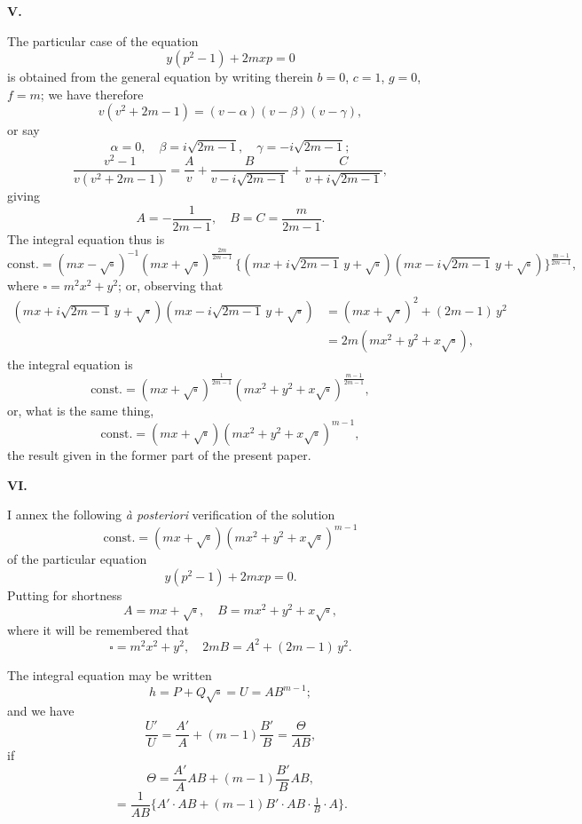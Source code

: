 \documentclass[11pt,a4paper]{article}
\theoremstyle{plain}
\begin{document}
\newpage
\begin{center}\textbf{V.}\end{center}

The particular case of the equation
\[
y(p^2 - 1) + 2 m x p = 0
\]
is obtained from the general equation by writing therein $b = 0$, $c = 1$, $g = 0$, $f = m$; we have therefore
\[
v(v^2 + 2 m - 1) = (v - \alpha)(v - \beta)(v - \gamma),
\]
or say
\[
\alpha = 0,\quad \beta = i\sqrt{2 m - 1},\quad \gamma = -i\sqrt{2 m - 1};
\]
\[
\frac{v^2 - 1}{v(v^2 + 2 m - 1)} = \frac{A}{v} + \frac{B}{v - i\sqrt{2 m - 1}} + \frac{C}{v + i\sqrt{2 m - 1}},
\]
giving
\[
A = -\frac{1}{2 m - 1},\quad B = C = \frac{m}{2 m - 1}.
\]
The integral equation thus is
\[
\text{const.} = (m x - \sqrt{\square})^{-1}(m x + \sqrt{\square})^{\frac{2m}{2m-1}}\,
\{(m x + i\sqrt{2 m - 1}\,y + \sqrt{\square})(m x - i\sqrt{2 m - 1}\,y + \sqrt{\square})\}^{\frac{m-1}{2m-1}},
\]
where $\square = m^2 x^2 + y^2$; or, observing that
\begin{align*}
(m x + i\sqrt{2 m - 1}\,y + \sqrt{\square})(m x - i\sqrt{2 m - 1}\,y + \sqrt{\square})
 &= (m x + \sqrt{\square})^2 + (2 m - 1)\,y^2 \\
 &= 2 m(m x^2 + y^2 + x\sqrt{\square}),
\end{align*}
the integral equation is
\[
\text{const.} = (m x + \sqrt{\square})^{\frac{1}{2m-1}}(m x^2 + y^2 + x\sqrt{\square})^{\frac{m-1}{2m-1}},
\]
or, what is the same thing,
\[
\text{const.} = (m x + \sqrt{\square})(m x^2 + y^2 + x\sqrt{\square})^{m-1},
\]
the result given in the former part of the present paper.

\begin{center}\textbf{VI.}\end{center}

I annex the following \textit{\`a posteriori} verification of the solution
\[
\text{const.} = (m x + \sqrt{\square})(m x^2 + y^2 + x\sqrt{\square})^{m-1}
\]
of the particular equation
\[
y(p^2 - 1) + 2 m x p = 0.
\]
\newpage
Putting for shortness
\[
A = m x + \sqrt{\square},\quad B = m x^2 + y^2 + x\sqrt{\square},
\]
where it will be remembered that
\[
\square = m^2 x^2 + y^2,\quad 2 m B = A^2 + (2 m - 1)\,y^2.
\]

The integral equation may be written
\[
h = P + Q\sqrt{\square} = U = A B^{m-1};
\]
and we have
\[
\frac{U'}{U} = \frac{A'}{A} + (m - 1)\frac{B'}{B} = \frac{\Theta}{A B},
\]
if
\[
\Theta = \frac{A'}{A} A B + (m - 1)\frac{B'}{B} A B,
\]
\[
= \frac{1}{A B}\{A'\cdot A B + (m - 1) B'\cdot A B \cdot \tfrac{1}{B}\cdot A\}.
\]
\end{document}

